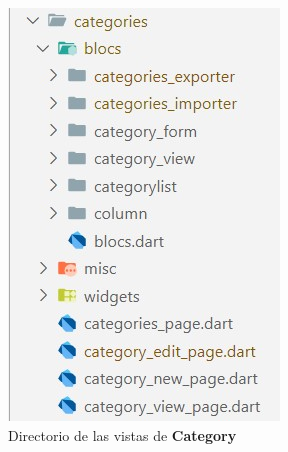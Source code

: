 \documentclass{article}
\begin{document}
\begin{figure}[H]
\begin{minipage}[b]{0.3\textwidth}
    \includegraphics[width=\textwidth]{images/category_page.jpg}
    \caption{Directorio de las vistas de \textbf{Category}}
    \label{fig:categorypage}
  \end{minipage}
  \hspace{0.02\textwidth}
  \begin{minipage}[b]{0.3\textwidth}
    \centering

\end{minipage}
\end{figure}
\end{document}
